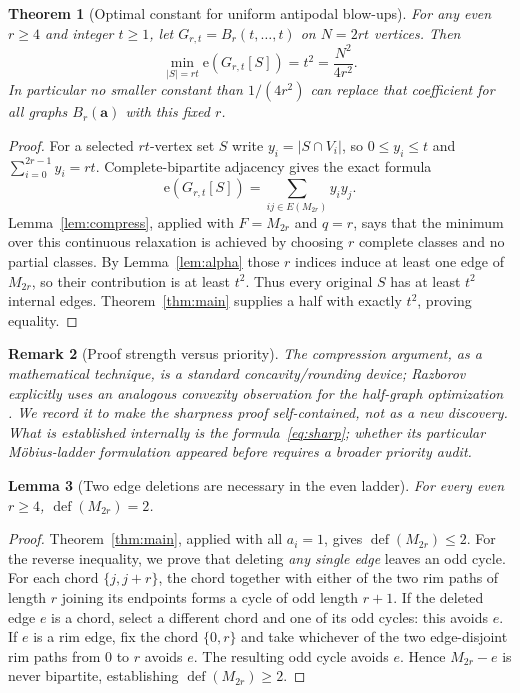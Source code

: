 \documentclass[11pt,a4paper]{article}
\newtheorem{theorem}{Theorem}[section]
\newtheorem{lemma}[theorem]{Lemma}
\newtheorem{remark}[theorem]{Remark}
\newcommand{\edges}{\mathrm e}
\newcommand{\defect}{\operatorname{def}}
\newcommand{\card}[1]{\lvert#1\rvert}
\begin{document}
\begin{theorem}[Optimal constant for uniform antipodal blow-ups]\label{thm:sharp}
For any even $r\ge4$ and integer $t\ge1$, let $G_{r,t}=B_r(t,\ldots,t)$ on $N=2rt$ vertices. Then
\begin{equation}\label{eq:sharp}
 \boxed{\min_{\card S=rt}\edges(G_{r,t}[S])=t^2=\frac{N^2}{4r^2}.}
\end{equation}
In particular no smaller constant than $1/(4r^2)$ can replace that coefficient for all graphs $B_r(\mathbf a)$ with this fixed $r$.
\end{theorem}
\begin{proof}
For a selected $rt$-vertex set $S$ write $y_i=\card{S\cap V_i}$, so $0\le y_i\le t$ and $\sum_{i=0}^{2r-1}y_i=rt$. Complete-bipartite adjacency gives the exact formula
\[
 \edges(G_{r,t}[S])=\sum_{ij\in E(M_{2r})}y_iy_j.
\]
Lemma~\ref{lem:compress}, applied with $F=M_{2r}$ and $q=r$, says that the minimum over this continuous relaxation is achieved by choosing $r$ complete classes and no partial classes. By Lemma~\ref{lem:alpha} those $r$ indices induce at least one edge of $M_{2r}$, so their contribution is at least $t^2$. Thus every original $S$ has at least $t^2$ internal edges. Theorem~\ref{thm:main} supplies a half with exactly $t^2$, proving equality.
\end{proof}
\begin{remark}[Proof strength versus priority]
The compression argument, as a mathematical technique, is a standard concavity/rounding device; Razborov explicitly uses an analogous convexity observation for the half-graph optimization \cite[\S2]{Raz2022}. We record it to make the sharpness proof self-contained, \emph{not} as a new discovery. What is established internally is the formula~\eqref{eq:sharp}; whether its particular M\"obius-ladder formulation appeared before requires a broader priority audit.
\end{remark}

\begin{lemma}[Two edge deletions are necessary in the even ladder]\label{lem:two}
For every even $r\ge4$, $\defect(M_{2r})=2$.
\end{lemma}
\begin{proof}
Theorem~\ref{thm:main}, applied with all $a_i=1$, gives $\defect(M_{2r})\le2$. For the reverse inequality, we prove that deleting \emph{any single edge} leaves an odd cycle. For each chord $\{j,j+r\}$, the chord together with either of the two rim paths of length $r$ joining its endpoints forms a cycle of odd length $r+1$. If the deleted edge $e$ is a chord, select a different chord and one of its odd cycles: this avoids $e$. If $e$ is a rim edge, fix the chord $\{0,r\}$ and take whichever of the two edge-disjoint rim paths from $0$ to $r$ avoids $e$. The resulting odd cycle avoids $e$. Hence $M_{2r}-e$ is never bipartite, establishing $\defect(M_{2r})\ge2$.
\end{proof}
\end{document}
